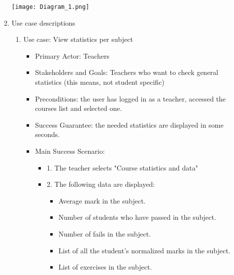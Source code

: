 \documentclass{article}
\begin{document}
\begin{enumerate}
\begin{enumerate}
		\texttt{[image: Diagram\_1.png]}
		\\
		\item{Use case descriptions}
		\begin{enumerate}
			\item{Use case: View statistics per subject}
			\begin{itemize}
				\item Primary Actor: Teachers
				\item Stakeholders and Goals: Teachers who want to check general statistics (this means, not student specific) 
				\item Preconditions: the user has logged in as a teacher, accessed the courses list and selected one.
				\item Success Guarantee: the needed statistics are displayed in some seconds.
				\item Main Success Scenario: 
					\begin{itemize}
					\item 1. The teacher selects "Course statistics and data"
					\item 2. The following data are displayed:
						\begin{itemize}
							\item Average mark in the subject.
							\item Number of students who have passed in the subject.
							\item Number of fails in the subject.
							\item List of all the student's normalized marks in the subject.
							\item List of exercises in the subject.
						\end{itemize}
				

\end{itemize}
\end{itemize}
\end{enumerate}
\end{enumerate}
\end{enumerate}
\end{document}

